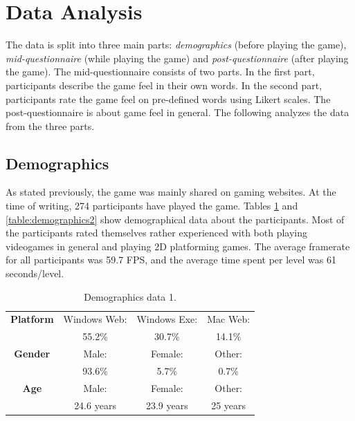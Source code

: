 \section{Data Analysis} \label{data}
The data is split into three main parts: \textit{demographics} (before playing the game), \textit{mid-questionnaire} (while playing the game) and \textit{post-questionnaire} (after playing the game). The mid-questionnaire consists of two parts. In the first part, participants describe the game feel in their own words. In the second part, participants rate the game feel on pre-defined words using Likert scales. The post-questionnaire is about game feel in general. The following analyzes the data from the three parts.

\subsection{Demographics}
As stated previously, the game was mainly shared on gaming websites. At the time of writing, 274 participants have played the game. Tables \ref{table:demographics1} and \ref{table:demographics2} show demographical data about the participants. Most of the participants rated themselves rather experienced with both playing videogames in general and playing 2D platforming games. The average framerate for all participants was 59.7 FPS, and the average time spent per level was 61 seconds/level.

\begin{table} \centering
\small
\caption{Demographics data 1.}
\label{table:demographics1}
\renewcommand{\arraystretch}{1.2}
\begin{tabular}{cccc}
\toprule
\textbf{Platform} & Windows Web: & Windows Exe: & Mac Web: \\
                  & 55.2\%      & 30.7\%      & 14.1\%  \\
\textbf{Gender}   & Male:        & Female:      & Other:   \\
                  & 93.6\%      & 5.7\%       & 0.7\%   \\
\textbf{Age}      & Male:     & Female:            & Other:        \\
                  & 24.6 years  & 23.9 years           & 25 years        \\
\bottomrule
\end{tabular}
\end{table}


